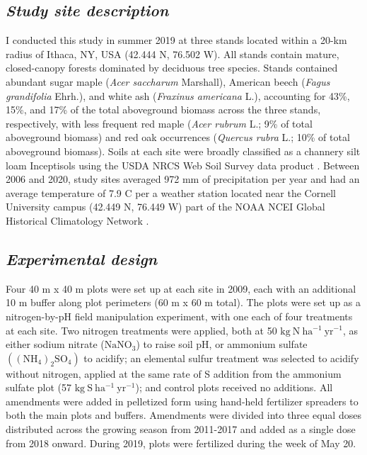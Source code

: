 \subsection{\textit{Study site description}}
\noindent I conducted this study in summer 2019 at three stands located within a 20-km radius of Ithaca, NY, USA (42.444 \textdegree{}N, 76.502 \textdegree{}W). All stands contain mature, closed-canopy forests dominated by deciduous tree species. Stands contained abundant sugar maple (\textit{Acer saccharum} Marshall), American beech (\textit{Fagus grandifolia} Ehrh.), and white ash (\textit{Fraxinus americana} L.), accounting for 43\%, 15\%, and 17\% of the total aboveground biomass across the three stands, respectively, with less frequent red maple (\textit{Acer rubrum} L.; 9\% of total aboveground biomass) and red oak occurrences (\textit{Quercus rubra} L.; 10\% of total aboveground biomass). Soils at each site were broadly classified as a channery silt loam Inceptisols using the USDA NRCS Web Soil Survey data product . Between 2006 and 2020, study sites averaged 972 mm of precipitation per year and had an average temperature of 7.9 \textdegree{}C per a weather station located near the Cornell University campus (42.449 \textdegree{}N, 76.449 \textdegree{}W) part of the NOAA NCEI Global Historical Climatology Network .

\subsection{\textit{Experimental design}}
\noindent Four 40 m x 40 m plots were set up at each site in 2009, each with an additional 10 m buffer along plot perimeters (60 m x 60 m total). The plots were set up as a nitrogen-by-pH field manipulation experiment, with one each of four treatments at each site. Two nitrogen treatments were applied, both at 50 $\mathrm{kg\ N\ ha^{-1}\ yr^{-1}}$, as either sodium nitrate ($\mathrm{NaNO_3}$) to raise soil pH, or ammonium sulfate $\mathrm{((NH_4)_{2}SO_4)}$ to acidify; an elemental sulfur treatment was selected to acidify without nitrogen, applied at the same rate of S addition from the ammonium sulfate plot (57 $\mathrm{kg\ S\ ha^{-1}\ yr^{-1}}$); and control plots received no additions. All amendments were added in pelletized form using hand-held fertilizer spreaders to both the main plots and buffers. Amendments were divided into three equal doses distributed across the growing season from 2011-2017 and added as a single dose from 2018 onward. During 2019, plots were fertilized during the week of May 20.


